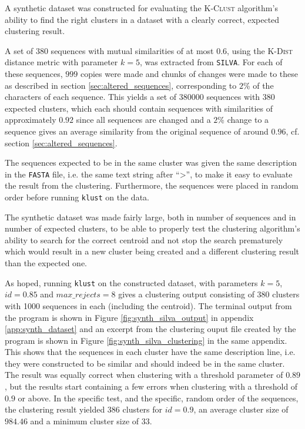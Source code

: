 A synthetic dataset was constructed for evaluating the \textsc{K-Clust}
algorithm's ability to find the right clusters in a dataset with a clearly
correct, expected clustering result.

A set of $380$ sequences with mutual similarities of at most $0.6$, using the
\textsc{K-Dist} distance metric with parameter $k=5$, was extracted from \texttt{SILVA}. For each of these sequences, $999$ copies were made and
chunks of changes were made to these as described in section
\ref{sec:altered_sequences}, corresponding to $2$\% of the characters of each
sequence. This yields a set of \num{380000} sequences with $380$ expected
clusters, which each should contain sequences with similarities of
approximately $0.92$ since all sequences are changed and a $2$\% change to a
sequence gives an average similarity from the original sequence of around
$0.96$, cf. section \ref{sec:altered_sequences}.

The sequences expected to be in the same cluster was given the same description
in the \texttt{FASTA} file, i.e. the same text string after ``>'', to make it
easy to evaluate the result from the clustering. Furthermore, the sequences
were placed in random order before running \texttt{klust} on the data.

The synthetic dataset was made fairly large, both in number of sequences and in
number of expected clusters, to be able to properly test the clustering
algorithm's ability to search for the correct centroid and not stop the search
prematurely which would result in a new cluster being created and a different
clustering result than the expected one.

As hoped, running \texttt{klust} on the constructed dataset, with parameters
$k=5$, $id=0.85$ and $max\_rejects=8$ gives a clustering output consisting of
$380$ clusters with 1000 sequences in each (including the centroid). The
terminal output from the program is shown in Figure
\ref{fig:synth_silva_output} in appendix \ref{app:synth_dataset} and an
excerpt from the clustering ouput file created by the program is shown in
Figure \ref{fig:synth_silva_clustering} in the same appendix. This shows that
the sequences in each cluster have the same description line, i.e. they were
constructed to be similar and should indeed be in the same cluster. The result
was equally correct when clustering with a threshold parameter of $0.89$, but
the results start containing a few errors when clustering with a threshold of
$0.9$ or above. In the specific test, and the specific, random order of the
sequences, the clustering result yielded $386$ clusters for $id=0.9$, an average
cluster size of $984.46$ and a minimum cluster size of $33$.

